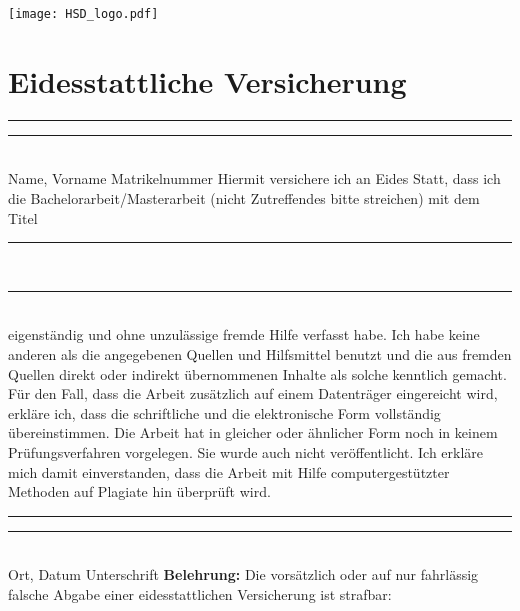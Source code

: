 
\newpage
\clearpairofpagestyles
{}
\texttt{[image: HSD\_logo.pdf]}
\section*{Eidesstattliche Versicherung}
\rule{6cm}{1pt} \hspace{1.23cm} \rule{6cm}{1pt}\\
\footnotesize{Name, Vorname}\hspace{4.8cm}
\footnotesize{Matrikelnummer}
\newline\newline
\newline
Hiermit versichere ich an Eides Statt, dass ich die Bachelorarbeit/Masterarbeit (nicht Zutreffendes bitte streichen) mit dem Titel \newline
\rule{\textwidth}{1pt}\\
\rule{\textwidth}{1pt}\\
eigenständig und ohne unzulässige fremde Hilfe verfasst habe. Ich habe keine anderen als die angegebenen Quellen und Hilfsmittel benutzt und die aus fremden Quellen direkt oder indirekt übernommenen Inhalte als solche kenntlich gemacht. Für den Fall, dass die Arbeit zusätzlich auf einem Datenträger eingereicht wird, erkläre ich, dass die schriftliche und die elektronische Form vollständig übereinstimmen. Die Arbeit hat in gleicher oder ähnlicher Form noch in keinem Prüfungsverfahren vorgelegen.
Sie wurde auch nicht veröffentlicht. Ich erkläre mich damit einverstanden, dass die Arbeit mit Hilfe computergestützter Methoden auf Plagiate hin überprüft wird.\newline
\rule{6cm}{1pt} \hspace{1.21cm} \rule{6cm}{1pt}\\
\newline
\footnotesize{Ort, Datum}\hspace{5.55cm}
\footnotesize{Unterschrift}
\newline\newline
\textbf{Belehrung:}\newline
Die vorsätzlich oder auf nur fahrlässig falsche Abgabe einer eidesstattlichen Versicherung ist strafbar:\newline
